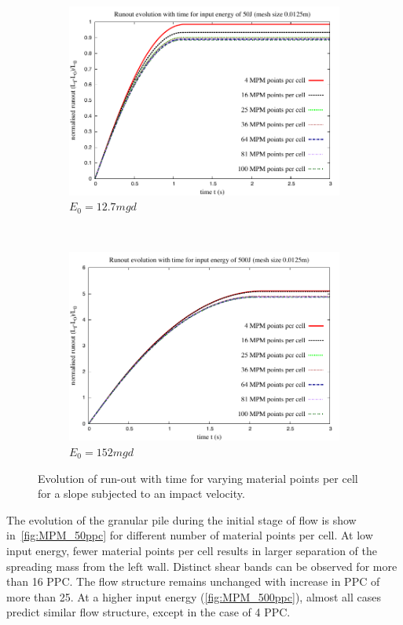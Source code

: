 \begin{figure}[tbhp]
\centering
\begin{subfigure}[b]{0.95\textwidth}
\includegraphics[width=\textwidth]{Runout_50}
\caption{$E_0=12.7mgd$}
\label{fig:Runout_50}
\end{subfigure}
\\
\begin{subfigure}[b]{0.95\textwidth}
\centering
\includegraphics[width=\textwidth]{Runout_500}
\caption{$E_0=152mgd$}
\label{fig:Runout_500}
\end{subfigure}
\caption{Evolution of run-out with time for varying material points per cell 
for a slope subjected to an impact velocity.}
\label{fig:Runout_MPM}
\end{figure}

The evolution of the granular pile during the initial stage of flow is show 
in~\cref{fig:MPM_50ppc} for different number of material points per cell. At 
low input energy, fewer material points per cell results in larger separation 
of the spreading mass from the left wall. Distinct shear bands can be observed 
for more than 16 PPC. 
The flow structure remains unchanged with increase in PPC of more than 25. At 
a higher input energy
(\cref{fig:MPM_500ppc}), almost all cases predict similar flow structure, 
except in the case of 4 PPC.

